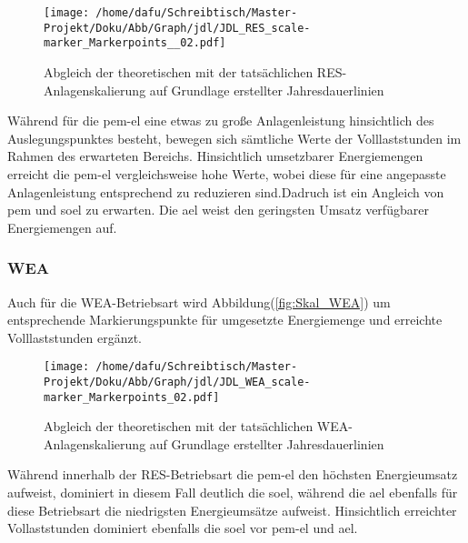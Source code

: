 \documentclass[onecolumn,10pt,titlepage]{article}
\begin{document}
\begin{figure}[H]

	\centering
	\texttt{[image: /home/dafu/Schreibtisch/Master-Projekt/Doku/Abb/Graph/jdl/JDL\_RES\_scale-marker\_Markerpoints\_\_02.pdf]}
	\caption[Abgleich Anlagenskalierung -RES]{Abgleich der theoretischen mit der tatsächlichen RES-Anlagenskalierung auf Grundlage erstellter Jahresdauerlinien}
	\label{fig:ABGL_SKAL_RES}
\end{figure}
Während für die \gls{pem}-\gls{el} eine etwas zu große Anlagenleistung hinsichtlich des Auslegungspunktes besteht, bewegen sich sämtliche Werte der Volllaststunden im Rahmen des erwarteten Bereichs. Hinsichtlich umsetzbarer Energiemengen erreicht die \gls{pem}-\gls{el} vergleichsweise hohe Werte, wobei diese für eine angepasste Anlagenleistung entsprechend zu reduzieren sind.Dadruch ist ein Angleich von \gls{pem} und \gls{soel} zu erwarten. Die \gls{ael} weist den geringsten Umsatz verfügbarer Energiemengen auf.
\newpage
\subsubsection{WEA}
Auch für die WEA-Betriebsart wird Abbildung(\ref{fig:Skal_WEA}) um entsprechende Markierungspunkte für umgesetzte Energiemenge und erreichte Volllaststunden ergänzt.\\

\begin{figure}[H]

	\centering
	\texttt{[image: /home/dafu/Schreibtisch/Master-Projekt/Doku/Abb/Graph/jdl/JDL\_WEA\_scale-marker\_Markerpoints\_02.pdf]}
	\caption[Abgleich Anlagenskalierung -WEA]{Abgleich der theoretischen mit der tatsächlichen WEA-Anlagenskalierung auf Grundlage erstellter Jahresdauerlinien}
	\label{fig:ABGL_SKAL_WEA}
\end{figure}
Während innerhalb der RES-Betriebsart die \gls{pem}-\gls{el} den höchsten Energieumsatz aufweist, dominiert in diesem Fall deutlich die \gls{soel}, während die \gls{ael} ebenfalls für diese Betriebsart die niedrigsten Energieumsätze aufweist. Hinsichtlich erreichter Vollaststunden dominiert ebenfalls die \gls{soel} vor \gls{pem}-\gls{el} und \gls{ael}.
\end{document}
